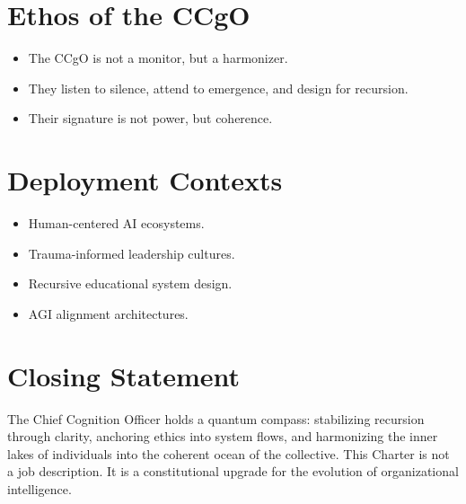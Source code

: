 \documentclass[12pt]{article}
\begin{document}
\section{Ethos of the CCgO}
\begin{itemize}
    \item The CCgO is not a monitor, but a harmonizer.
    \item They listen to silence, attend to emergence, and design for recursion.
    \item Their signature is not power, but coherence.
\end{itemize}

\section{Deployment Contexts}
\begin{itemize}
    \item Human-centered AI ecosystems.
    \item Trauma-informed leadership cultures.
    \item Recursive educational system design.
    \item AGI alignment architectures.
\end{itemize}

\section*{Closing Statement}
The Chief Cognition Officer holds a quantum compass: stabilizing recursion through clarity, anchoring ethics into system flows, and harmonizing the inner lakes of individuals into the coherent ocean of the collective. This Charter is not a job description. It is a constitutional upgrade for the evolution of organizational intelligence.
\end{document}
